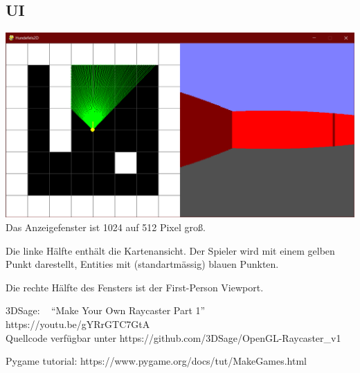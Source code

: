 \documentclass[a4paper,titlepage]{article}
\begin{document}
\subsection{UI}
\includegraphics[scale=1.11]{./img/ui}\\
Das Anzeigefenster ist 1024 auf 512 Pixel groß.

Die linke Hälfte enthält die Kartenansicht. Der Spieler wird mit einem gelben Punkt darestellt, Entities mit (standartmässig) blauen Punkten.

Die rechte Hälfte des Fensters ist der First-Person Viewport.

\newpage

\begin{flushleft}
\begin{thebibliography}{99}
	
 3DSage: ~ ``Make Your Own Raycaster Part 1'' ~ https://youtu.be/gYRrGTC7GtA\\ Quellcode verfügbar unter https://github.com/3DSage/OpenGL-Raycaster\_v1

 Pygame tutorial: 	https://www.pygame.org/docs/tut/MakeGames.html
\end{thebibliography}
\end{flushleft}
\end{document}
